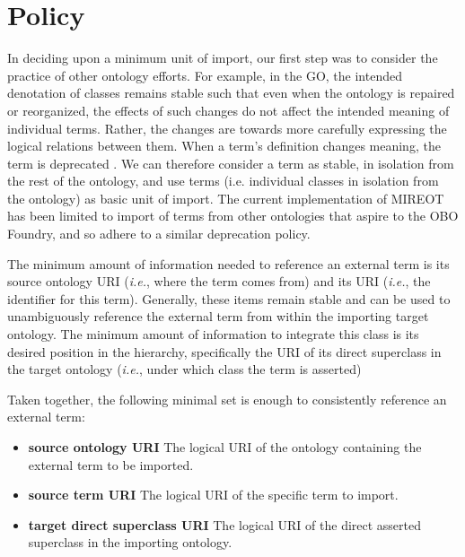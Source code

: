 \documentclass{ao2e}%
\begin{document}
\section{Policy}

In deciding upon a minimum unit of import, our first step was to consider the practice of other ontology efforts.
For example, in the \ac{GO}, the intended denotation of classes remains stable such that even when the ontology is repaired or reorganized, the effects of such changes do not affect the intended meaning of individual terms.
Rather, the changes are towards more carefully expressing the logical relations between them.
When a term's definition changes meaning, the term is deprecated \cite{GOGuide}.
We can therefore consider a term as stable, in isolation from the rest of the ontology, and use terms (i.e. individual classes in isolation from the ontology) as basic unit of import.
The current implementation of \ac{MIREOT} has been limited to import of terms from other ontologies that aspire to the OBO Foundry, and so adhere to a similar deprecation policy.

The minimum amount of information needed to reference an external term is its source ontology URI (\textit {i.e.}, where the term comes from) and its URI (\textit {i.e.}, the identifier for this term). 
Generally, these items remain stable and can be used to unambiguously reference the external term from within the importing target ontology.
The minimum amount of information to integrate this class is its desired position in the hierarchy, specifically the URI of its direct superclass in the target ontology (\textit {i.e.}, under which class the term is asserted)

Taken together, the following minimal set is enough to consistently reference an external term:
\begin{itemize}
 \item \textbf{source ontology URI} The logical URI of the ontology containing the external term to be imported. 
 \item \textbf{source term URI} The logical URI of the specific term to import. 
 \item \textbf{target direct superclass URI} The logical URI of the direct asserted superclass in the importing ontology.
\end{itemize} 
\end{document}
